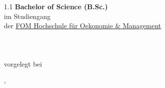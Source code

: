 \begin{titlepage}
\begin{center}
\begin{spacing}{1.1}
    {\large\bfseries Bachelor of Science (B.Sc.)}\\
  	{\large im Studiengang {\large \daStudiengang}} \\%
  	{\large der \href{\daUniURL}{FOM Hochschule für Oekonomie \& Management}} \\%
    {\normalsize\daAutor}\\%
    {\normalsize\daAutorAdresse}\\%
    {\normalsize\daAutorPLZ~\daAutorOrt}\\%
    {\small vorgelegt bei}\\%
    {\normalsize\daGutachterEins}\par%
  \end{spacing}
  {\normalsize \daAutorOrt, \daDate}
\end{center}


\end{titlepage}
